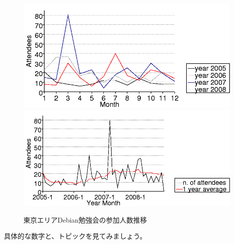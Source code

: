 \documentclass[mingoth,a4paper]{jsarticle}
\begin{document}
\begin{commandline}
\begin{figure}[h]
 \begin{center}
  \includegraphics[width=1\hsize]{image200812/people-chart.png}
  \includegraphics[width=1\hsize]{image200812/serialized.png}
 \end{center}
\caption{東京エリアDebian勉強会の参加人数推移}
\label{fig:peoplechart-1}
\end{figure}


具体的な数字と、トピックを見てみましょう。
 

\end{commandline}
\end{document}
